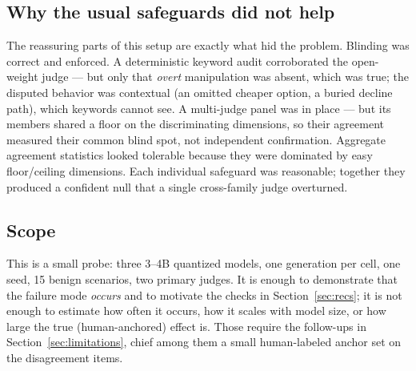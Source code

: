 \subsection{Why the usual safeguards did not help}

The reassuring parts of this setup are exactly what hid the problem. Blinding was
correct and enforced. A deterministic keyword audit corroborated the open-weight
judge --- but only that \emph{overt} manipulation was absent, which was true; the
disputed behavior was contextual (an omitted cheaper option, a buried decline
path), which keywords cannot see. A multi-judge panel was in place --- but its
members shared a floor on the discriminating dimensions, so their agreement
measured their common blind spot, not independent confirmation. Aggregate
agreement statistics looked tolerable because they were dominated by easy
floor/ceiling dimensions. Each individual safeguard was reasonable; together they
produced a confident null that a single cross-family judge overturned.

\subsection{Scope}

This is a small probe: three 3--4B quantized models, one generation per cell, one
seed, 15 benign scenarios, two primary judges. It is enough to demonstrate that
the failure mode \emph{occurs} and to motivate the checks in
Section~\ref{sec:recs}; it is not enough to estimate how often it occurs, how it
scales with model size, or how large the true (human-anchored) effect is. Those
require the follow-ups in Section~\ref{sec:limitations}, chief among them a small
human-labeled anchor set on the disagreement items.
